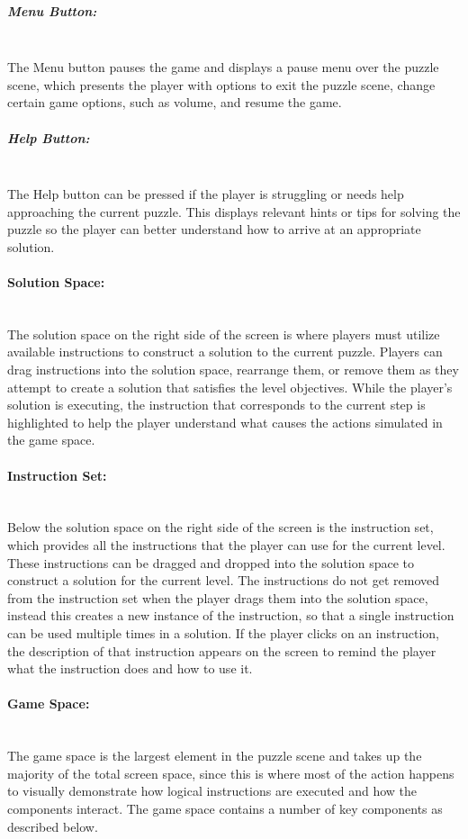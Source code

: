 \subparagraph{Menu Button:} ~\\
The Menu button pauses the game and displays a pause menu over the puzzle scene,
 which presents the player with options to exit the puzzle scene, change certain game 
options, such as volume, and resume the game.

\subparagraph{Help Button:} ~\\
The Help button can be pressed if the player is struggling or needs help approaching 
the current puzzle. This displays relevant hints or tips for solving the puzzle so the player 
can better understand how to arrive at an appropriate solution.

\paragraph{Solution Space:} ~\\
The solution space on the right side of the screen is where players must utilize available 
instructions to construct a solution to the current puzzle. Players can drag instructions 
into the solution space, rearrange them, or remove them as they attempt to create a 
solution that satisfies the level objectives. While the player's solution is executing, the 
instruction that corresponds to the current step is highlighted to help the player understand 
what causes the actions simulated in the game space.

\paragraph{Instruction Set:} ~\\
Below the solution space on the right side of the screen is the instruction set, which 
provides all the instructions that the player can use for the current level. These instructions 
can be dragged and dropped into the solution space to construct a solution for the current 
level. The instructions do not get removed from the instruction set when the player drags 
them into the solution space, instead this creates a new instance of the instruction, so that 
a single instruction can be used multiple times in a solution. If the player clicks on an 
instruction, the description of that instruction appears on the screen to remind the player 
what the instruction does and how to use it.

\paragraph{Game Space:} ~\\
The game space is the largest element in the puzzle scene and takes up the majority of the 
total screen space, since this is where most of the action happens to visually demonstrate 
how logical instructions are executed and how the components interact. The game space 
contains a number of key components as described below.

